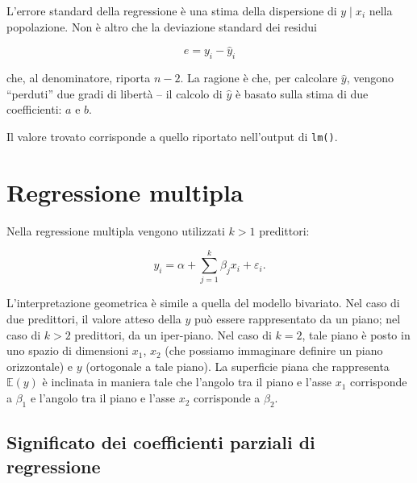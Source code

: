 \documentclass[
  11pt,
]{krantz}
\makeatletter
\newenvironment{Shaded}{\begin{snugshade}}{\end{snugshade}}
\newcommand{\CommentTok}[1]{\textcolor[rgb]{0.37,0.37,0.37}{\textit{#1}}}
\newcommand{\DecValTok}[1]{\textcolor[rgb]{0.06,0.06,0.06}{#1}}
\newcommand{\FunctionTok}[1]{\textcolor[rgb]{0,0,0}{#1}}
\newcommand{\NormalTok}[1]{#1}
\newcommand{\OtherTok}[1]{\textcolor[rgb]{0.37,0.37,0.37}{#1}}
\newcommand{\SpecialCharTok}[1]{\textcolor[rgb]{0,0,0}{#1}}
\newenvironment{kframe}{%
\medskip{}
\setlength{\fboxsep}{.8em}
 \def\at@end@of@kframe{}%
 \ifinner\ifhmode%
  \def\at@end@of@kframe{\end{minipage}}%
  \begin{minipage}{\columnwidth}%
 \fi\fi%
 \def\FrameCommand##1{\hskip\@totalleftmargin \hskip-\fboxsep
 \colorbox{shadecolor}{##1}\hskip-\fboxsep
     \hskip-\linewidth \hskip-\@totalleftmargin \hskip\columnwidth}%
 \MakeFramed {\advance\hsize-\width
   \@totalleftmargin\z@ \linewidth\hsize
   \@setminipage}}%
 {\par\unskip\endMakeFramed%
 \at@end@of@kframe}
\renewenvironment{Shaded}{\begin{kframe}}{\end{kframe}}
\theoremstyle{definition}
\theoremstyle{definition}
\theoremstyle{definition}
\theoremstyle{definition}
\theoremstyle{remark}
\makeatother
\begin{document}
L'errore standard della regressione è una stima della dispersione di \(y \mid x_i\) nella popolazione. Non è altro che la deviazione standard dei residui

\[
e = y_i - \hat{y}_i
\]

che, al denominatore, riporta \(n-2\). La ragione è che, per calcolare \(\hat{y}\), vengono ``perduti'' due gradi di libertà -- il calcolo di \(\hat{y}\) è basato sulla stima di due coefficienti: \(a\) e \(b\).

\begin{Shaded}
\end{Shaded}

Il valore trovato corrisponde a quello riportato nell'output di \texttt{lm()}.

\hypertarget{regressione-multipla}{%
\section{Regressione multipla}\label{regressione-multipla}}

Nella regressione multipla vengono utilizzati \(k > 1\) predittori:

\[
y_i = \alpha + \sum_{j=1}^k \beta_j x_i + \varepsilon_i.
\]

L'interpretazione geometrica è simile a quella del modello bivariato. Nel caso di due predittori, il valore atteso della \(y\) può essere rappresentato da un piano; nel caso di \(k > 2\) predittori, da un iper-piano. Nel caso di \(k=2\), tale piano è posto in uno spazio di dimensioni \(x_1\), \(x_2\) (che possiamo immaginare definire un piano orizzontale) e \(y\) (ortogonale a tale piano). La superficie piana che rappresenta \(\mathbb{E}(y)\) è inclinata in maniera tale che l'angolo tra il piano e l'asse \(x_1\) corrisponde a \(\beta_1\) e l'angolo tra il piano e l'asse \(x_2\) corrisponde a \(\beta_2\).

\hypertarget{significato-dei-coefficienti-parziali-di-regressione}{%
\subsection{Significato dei coefficienti parziali di regressione}\label{significato-dei-coefficienti-parziali-di-regressione}}
\end{document}
